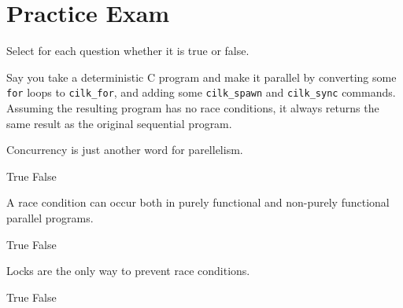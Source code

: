 \chapter{Practice Exam}
\label{ch:exam-practice}

\begin{cluster}

\begin{gram}
Select for each question whether it is true or false.
\end{gram}

\begin{parts}
\begin{problem}[blah][2]
Say you take a deterministic C program and make it
parallel by converting some \texttt{for} loops to \texttt{cilk\_for},
and adding some \texttt{cilk\_spawn} and \texttt{cilk\_sync} commands.
Assuming the resulting program has no race conditions, it always
returns the same result as the original sequential program.


\end{problem}

\begin{problem}[2]
Concurrency is just another word for parellelism.  
\begin{pickone}
\choice True
\correctchoice False
\end{pickone}
\end{problem}

\begin{problem}[2]
A race condition can occur both in purely functional and non-purely
functional parallel programs.
\begin{pickone}
\choice True
\correctchoice False
\end{pickone}
\end{problem}

\begin{problem}[2]
Locks are the only way to prevent race conditions.
\begin{pickone}
\choice True
\correctchoice False
\end{pickone}
\end{problem}

\begin{problem}[2]


\end{problem}
\end{parts}
\end{cluster}
